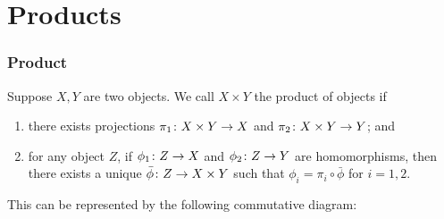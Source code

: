 

\section{Products}

\subsubsection*{Product}

\begin{definition}
    Suppose \(X,Y\) are two objects.
    We call \(X \times Y\) the product of objects if
    \begin{enumerate}[label={(\roman*)}, itemsep=0mm]
        \item there exists projections \(\pi_1\colon X \times Y\to X\)
            and \(\pi_2\colon X \times Y\to Y\); and
        \item for any object \(Z\),
            if \(\phi_1\colon Z\to X\) and \(\phi_2\colon Z\to Y\) are homomorphisms,
            then there exists a unique \(\bar{\phi}\colon Z\to X \times Y\)
            such that \(\phi_i = \pi_i\circ\bar{\phi}\) for \(i = 1,2\).
    \end{enumerate}

    This can be represented by the following commutative diagram:
    \begin{center}
    \end{center}
\end{definition}

